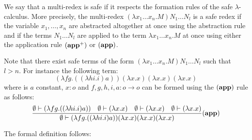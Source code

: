We say that a multi-redex is safe if it respects the formation rules of the safe $\lambda$-calculus. More precisely,
the multi-redex $(\lambda x_1 \ldots x_n . M) N_1 \ldots N_l$ is a safe redex if the variable $x_1,\ldots,x_n$
are abstracted altogether at once using the abstraction rule and if the terms $N_1 \ldots N_l$ are applied to the
term $\lambda x_1 \ldots x_n . M$ at once using either the application rule $\mathbf{(app^+)}$ or $\mathbf{(app)}$.

Note that there exist safe terms of the form $(\lambda x_1 \ldots x_n . M) N_1 \ldots N_l$
such that $l>n$. For instance the following term:
$$ (\lambda f g . ((\lambda h i . i) a) ) (\lambda x.x) (\lambda x.x) (\lambda x.x)$$
where is $a$ constant, $x : o$ and $f,g,h,i,a:o \rightarrow o$ can be formed using the $\mathbf{(app)}$ rule as follows:
$$ \frac{\displaystyle 
    \emptyset \vdash (\lambda f g . ((\lambda h i . i) a) )
        \quad \emptyset \vdash (\lambda x.x)
        \quad \emptyset \vdash (\lambda x.x)
        \quad \emptyset \vdash (\lambda x.x)
    }{
       \emptyset \vdash (\lambda f g . ((\lambda h i . i) a) ) (\lambda x.x) (\lambda x.x) (\lambda x.x)
    } \mathbf{(app)}
$$


The formal definition follows:

